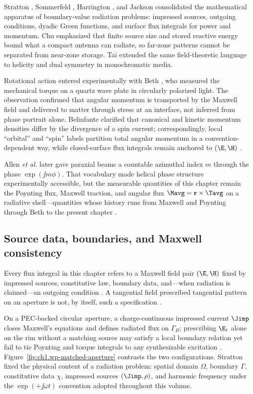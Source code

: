Stratton \cite{stratton1941}, Sommerfeld \cite{sommerfeld1949}, Harrington
\cite{harrington2001}, and Jackson \cite{jackson1999} consolidated the mathematical
apparatus of boundary-value radiation problems: impressed sources, outgoing conditions,
dyadic Green functions, and surface flux integrals for power and momentum. Chu
\cite{chu1948} emphasized that finite source size and stored reactive energy bound what
a compact antenna can radiate, so far-zone patterns cannot be separated from near-zone
storage. Tai \cite{tai1994} extended the same field-theoretic language to helicity and
dual symmetry in monochromatic media.

Rotational action entered experimentally with Beth \cite{beth1936}, who measured the
mechanical torque on a quartz wave plate in circularly polarized light. The observation
confirmed that angular momentum is transported by the Maxwell field and delivered to
matter through stress at an interface, not inferred from phase portrait alone. Belinfante
\cite{belinfante1940} clarified that canonical and kinetic momentum densities differ by
the divergence of a spin current; correspondingly, local ``orbital'' and ``spin''
labels partition total angular momentum in a convention-dependent way, while closed-surface
flux integrals remain anchored to $(\E,\H)$ \cite{belinfante1940,stratton1941}.

Allen \emph{et al.} \cite{allen1992} later gave paraxial beams a countable azimuthal
index $m$ through the phase $\exp(\jj m\phi)$. That vocabulary made helical phase
structure experimentally accessible, but the measurable quantities of this chapter remain
the Poynting flux, Maxwell traction, and angular flux $\Mavg=\mathbf{r}\times\Tavg$
on a radiative shell---quantities whose history runs from Maxwell and Poynting through
Beth to the present chapter \cite{poynting1884,beth1936,allen1992}.
\subsection{Source data, boundaries, and Maxwell consistency}
\label{sec:ch01.0.1}

Every flux integral in this chapter refers to a Maxwell field pair $(\E,\H)$ fixed
by impressed sources, constitutive law, boundary data, and---when radiation is
claimed---an outgoing condition \cite{stratton1941,maxwell1873}. A tangential field
prescribed tangential pattern on an aperture is not, by itself, such a specification
\cite{harrington2001}.

On a PEC-backed circular aperture, a charge-continuous impressed current $\Jimp$ closes Maxwell's equations and defines radiated flux on $\Gamma_R$; prescribing $\E_t$ alone on the rim without a matching source may satisfy a local boundary relation yet fail to tie Poynting and torque integrals to any synthesizable excitation \cite{stratton1941,harrington2001}. Figure~\ref{fig:ch1.wp-matched-aperture} contrasts the two configurations. Stratton \cite{stratton1941} fixed the physical content of a radiation problem: spatial domain \(\Omega\), boundary \(\Gamma\), constitutive data \(\chi\), impressed sources \((\Jimp,\rho)\), and harmonic frequency under the \(\exp(+\jj\omega t)\) convention adopted throughout this volume.

